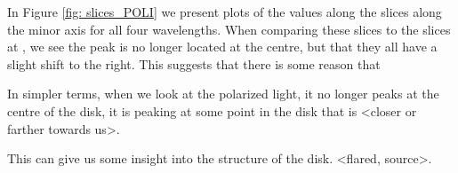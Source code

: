 In Figure \ref{fig: slices_POLI} we present plots of the \POLI values along the slices along the minor axis for all four wavelengths. When comparing these slices to the slices at \SIns, we see the peak is no longer located at the centre, but that they all have a slight shift to the right. This suggests that there is some reason that 



In simpler terms, when we look at the polarized light, it no longer peaks at the centre of the disk, it is peaking at some point in the disk that is <closer or farther towards us>. 

This can give us some insight into the structure of the disk. <flared, source>. 








